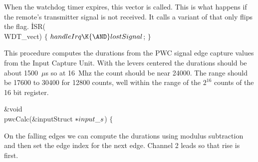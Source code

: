 When the watchdog timer expires, this vector is called.
This is what happens if the remote's transmitter signal is not received.
It calls a variant of  that only flips the 
flag.
\Y\B\.{ISR}(\\{WDT\_vect})\7
${}\{{}$\1\7
${}\\{handleIrq}\K{\AND}\\{lostSignal}{}$;\7
\4${}\}{}$\2\Y\par
\fi

This procedure computes the durations from the PWC signal edge capture values
from the Input Capture Unit.
With the levers centered the durations should be about 1500~$\mu$s so at
16~Mhz the count should be near 24000.
The range should be 17600 to 30400 for 12800 counts, well within the range
of the $2^{16}$ counts of the 16 bit register.


\Y\B\&{void} \\{pwcCalc}(\&{inputStruct} ${}{*}\\{input\_s}{}$)\1\1\7
$\{{}$\Y\par
\fi

On the falling edges we can compute the durations using modulus subtraction
and then set the edge index for the next edge.
Channel 2 leads so that rise is first.

